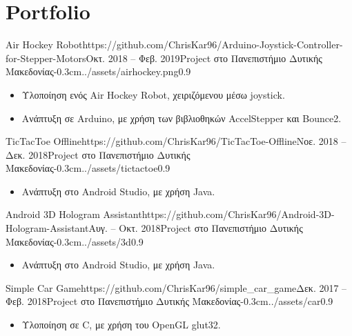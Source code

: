 \documentclass{mycv}
\begin{document}
	\section{Portfolio}
	\begin{EntryDatedImage}{Air Hockey Robot}{https://github.com/ChrisKar96/Arduino-Joystick-Controller-for-Stepper-Motors}{Οκτ. 2018 -- Φεβ. 2019}{Project στο Πανεπιστήμιο Δυτικής Μακεδονίας}{-0.3cm}{../assets/airhockey.png}{0.9}
	\begin{itemize}
		\item Υλοποίηση ενός Air Hockey Robot, χειριζόμενου μέσω joystick.
		\item Ανάπτυξη σε Arduino, με χρήση των βιβλιοθηκών AccelStepper και Bounce2.
	\end{itemize}
	\end{EntryDatedImage}

	\vspace{0.75cm}
	
	\begin{EntryDatedImage}{TicTacToe Offline}{https://github.com/ChrisKar96/TicTacToe-Offline}{Νοε. 2018 -- Δεκ. 2018}{Project στο Πανεπιστήμιο Δυτικής Μακεδονίας}{-0.3cm}{../assets/tictactoe}{0.9}
		\begin{itemize}
			\item Ανάπτυξη στο Android Studio, με χρήση Java.
		\end{itemize}
	\end{EntryDatedImage}

	\vspace{0.75cm}

	\begin{EntryDatedImage}{Android 3D Hologram Assistant}{https://github.com/ChrisKar96/Android-3D-Hologram-Assistant}{Αυγ. -- Οκτ. 2018}{Project στο Πανεπιστήμιο Δυτικής Μακεδονίας}{-0.3cm}{../assets/3d}{0.9}
	\begin{itemize}
		\item Ανάπτυξη στο Android Studio, με χρήση Java.
	\end{itemize}
	\end{EntryDatedImage}

	\vspace{0.75cm}

	\begin{EntryDatedImage}{Simple Car Game}{https://github.com/ChrisKar96/simple_car_game}{Δεκ. 2017 -- Φεβ. 2018}{Project στο Πανεπιστήμιο Δυτικής Μακεδονίας}{-0.3cm}{../assets/car}{0.9}
	\begin{itemize}
		\item Υλοποίηση σε C, με χρήση του OpenGL glut32.
	\end{itemize}
	\end{EntryDatedImage}
\end{document}
